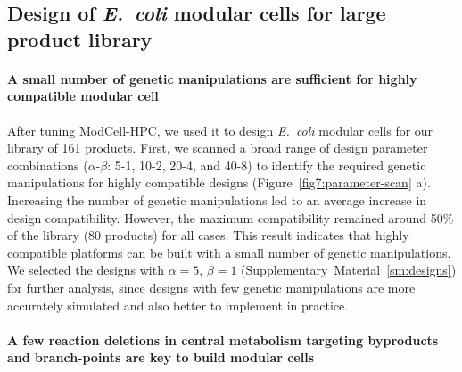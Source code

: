 {\subsection{Design of \textit{E.~coli} modular cells for large product library}

\paragraph{A small number of genetic manipulations are sufficient for highly compatible modular cell}
After tuning ModCell-HPC, we used it to design \textit{E.~coli} modular cells for our library of 161 products.
First, we scanned a broad range of design parameter combinations ($\alpha$-$\beta$: 5-1, 10-2, 20-4, and 40-8) to identify the required genetic manipulations for highly compatible designs (Figure~\ref{fig7:parameter-scan} a).
Increasing the number of genetic manipulations led to an average increase in design compatibility.
However, the maximum compatibility remained around 50\% of the library (80 products) for all cases.
This result indicates that highly compatible platforms can be built with a small number of genetic manipulations.
We selected the designs with $\alpha=5$, $\beta=1$ (Supplementary~Material~\ref{sm:designs}) for further analysis, since designs with few genetic manipulations are more accurately simulated and also better to implement in practice.

\paragraph{A few reaction deletions in central metabolism targeting byproducts and branch-points are key to build modular cells}

}
